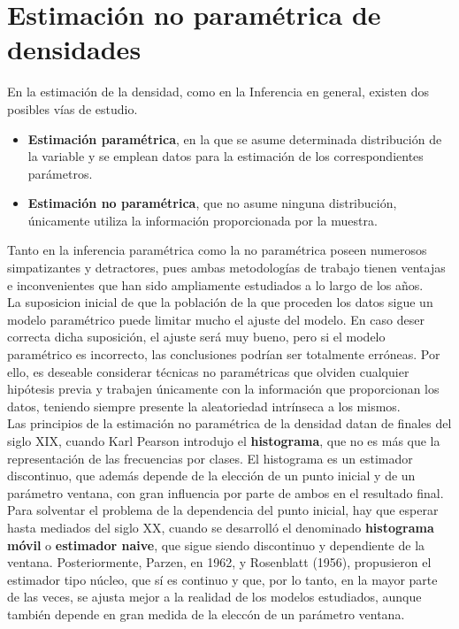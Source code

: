 \chapter{Estimación no paramétrica de densidades}

\noindent En la estimación de la densidad, como en la Inferencia en general, existen dos posibles vías de estudio.
\begin{itemize}
    \item \textbf{Estimación paramétrica}, en la que se asume determinada distribución de la variable y se emplean datos para la estimación de los correspondientes parámetros.
    \item \textbf{Estimación no paramétrica}, que no asume ninguna distribución, únicamente utiliza la información proporcionada por la muestra.
\end{itemize}
Tanto en la inferencia paramétrica como la no paramétrica poseen numerosos simpatizantes y detractores, pues ambas metodologías de trabajo tienen ventajas e inconvenientes que han sido ampliamente estudiados a lo largo de los años.
\\
\newline
\noindent La suposicion inicial de que la población de la que proceden los datos sigue un modelo paramétrico puede limitar mucho el ajuste del modelo. En caso deser correcta dicha suposición, el ajuste será muy bueno, pero si el modelo paramétrico es incorrecto, las conclusiones podrían ser totalmente erróneas. Por ello, es deseable considerar técnicas no paramétricas que olviden cualquier hipótesis previa y trabajen únicamente con la información que proporcionan los datos, teniendo siempre presente la aleatoriedad intrínseca a los mismos.
\\
\newline
\noindent Las principios de la estimación no paramétrica de la densidad datan de finales del siglo XIX, cuando Karl Pearson introdujo el \textbf{histograma}, que no es más que la representación de las frecuencias por clases. El histograma es un estimador discontinuo, que además depende de la elección de un punto inicial y de un parámetro ventana, con gran influencia por parte de ambos en el resultado final.
\\
\newline
\noindent Para solventar el problema de la dependencia del punto inicial, hay que esperar hasta mediados del siglo XX, cuando se desarrolló el denominado\textbf{ histograma móvil} o \textbf{estimador naive}, que sigue siendo discontinuo y dependiente de la ventana. Posteriormente, Parzen, en 1962, y Rosenblatt (1956), propusieron el estimador tipo núcleo, que sí es continuo y que, por lo tanto, en la mayor parte de las veces, se ajusta mejor a la realidad de los modelos estudiados, aunque también depende en gran medida de la eleccón de un parámetro ventana.
